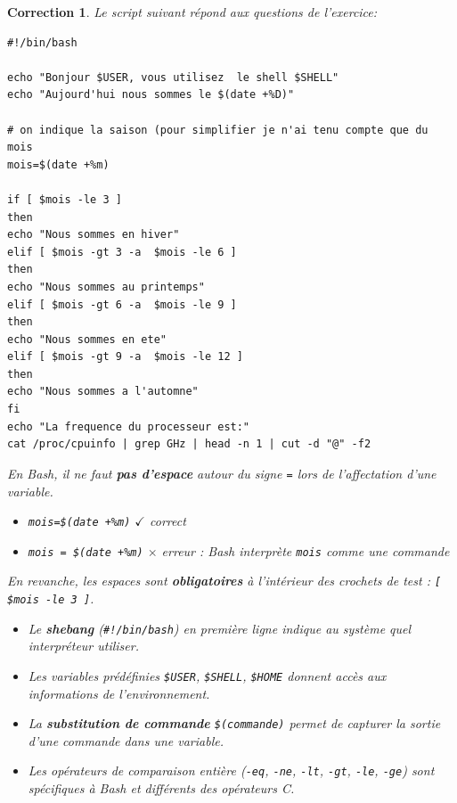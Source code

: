 \documentclass[a4paper,11pt]{article}
\theoremstyle{plain}
\newtheorem{correction}{Correction}
\theoremstyle{definition}
\begin{document}
\begin{correction}
Le script suivant répond aux questions de l'exercice:
\begin{lstlisting}
#!/bin/bash

echo "Bonjour $USER, vous utilisez  le shell $SHELL"
echo "Aujourd'hui nous sommes le $(date +%D)"

# on indique la saison (pour simplifier je n'ai tenu compte que du mois
mois=$(date +%m)

if [ $mois -le 3 ]
then
echo "Nous sommes en hiver"
elif [ $mois -gt 3 -a  $mois -le 6 ]
then
echo "Nous sommes au printemps"
elif [ $mois -gt 6 -a  $mois -le 9 ]
then
echo "Nous sommes en ete"
elif [ $mois -gt 9 -a  $mois -le 12 ]
then
echo "Nous sommes a l'automne"
fi
echo "La frequence du processeur est:"
cat /proc/cpuinfo | grep GHz | head -n 1 | cut -d "@" -f2
\end{lstlisting}

\begin{attention}
En Bash, il ne faut \textbf{pas d'espace} autour du signe \texttt{=} lors de l'affectation d'une variable.
\begin{itemize}
    \item \texttt{mois=\$(date +\%m)} \quad $\checkmark$ \quad correct
    \item \texttt{mois = \$(date +\%m)} \quad $\times$ \quad erreur : Bash interprète \texttt{mois} comme une commande
\end{itemize}
En revanche, les espaces sont \textbf{obligatoires} à l'intérieur des crochets de test : \texttt{[ \$mois -le 3 ]}.
\end{attention}

\begin{pointcle}
\begin{itemize}
    \item Le \textbf{shebang} (\texttt{\#!/bin/bash}) en première ligne indique au système quel interpréteur utiliser.
    \item Les variables prédéfinies \texttt{\$USER}, \texttt{\$SHELL}, \texttt{\$HOME} donnent accès aux informations de l'environnement.
    \item La \textbf{substitution de commande} \texttt{\$(commande)} permet de capturer la sortie d'une commande dans une variable.
    \item Les opérateurs de comparaison entière (\texttt{-eq}, \texttt{-ne}, \texttt{-lt}, \texttt{-gt}, \texttt{-le}, \texttt{-ge}) sont spécifiques à Bash et différents des opérateurs C.
\end{itemize}
\end{pointcle}

\end{correction}
\end{document}
